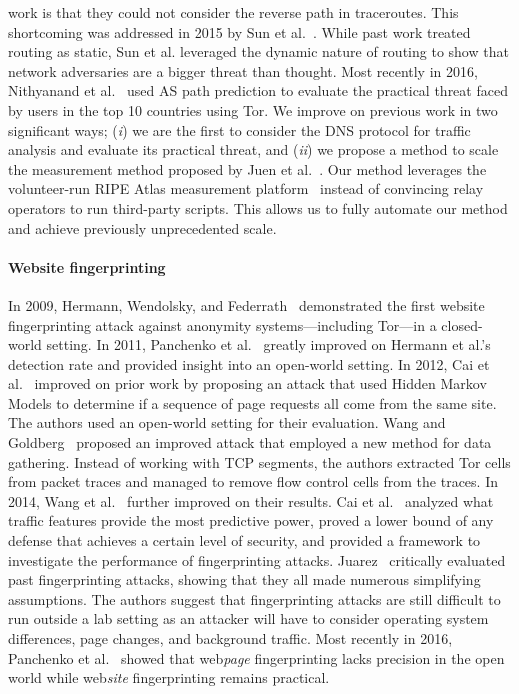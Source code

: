 work is that they could not consider the reverse path in traceroutes.  This
shortcoming was addressed in 2015 by Sun et al.~\cite{Sun2015a}.  While past
work treated routing as static, Sun et al.  leveraged the dynamic nature of
routing to show that network adversaries are a bigger threat than thought.
Most recently in 2016, Nithyanand et al.~\cite{Nithyanand2016a} used AS path
prediction to evaluate the practical threat faced by users in the top 10
countries using Tor.  We improve on previous work in two significant ways;
(\emph{i}) we are the first to consider the DNS protocol for traffic analysis
and evaluate its practical threat, and (\emph{ii}) we propose a method to scale
the measurement method proposed by Juen et al.~\cite{Juen2015a}.  Our method
leverages the volunteer-run RIPE Atlas measurement platform~\cite{atlas}
instead of convincing relay operators to run third-party scripts.  This allows
us to fully automate our method and achieve previously unprecedented scale.

\paragraph{Website fingerprinting}
In 2009, Hermann, Wendolsky, and Federrath~\cite{Hermann2009a} demonstrated the
first website fingerprinting attack against anonymity systems---including
Tor---in a closed-world setting.  In 2011, Panchenko et
al.~\cite{Panchenko2011a} greatly improved on Hermann et al.'s detection rate
and provided insight into an open-world setting.  In 2012, Cai et
al.~\cite{Cai2012a} improved on prior work by proposing an attack that used
Hidden Markov Models to determine if a sequence of page requests all come from
the same site.  The authors used an open-world setting for their evaluation.
Wang and Goldberg~\cite{Wang2013a} proposed an improved attack that employed a
new method for data gathering.  Instead of working with TCP segments, the
authors extracted Tor cells from packet traces and managed to remove flow
control cells from the traces.  In 2014, Wang et al.~\cite{Wang2014a} further
improved on their results.  Cai et al.~\cite{Cai2014b} analyzed what traffic
features provide the most predictive power, proved a lower bound of any defense
that achieves a certain level of security, and provided a framework to
investigate the performance of fingerprinting attacks.
Juarez~\cite{Juarez2014a} critically evaluated past fingerprinting attacks,
showing that they all made numerous simplifying assumptions.  The authors
suggest that fingerprinting attacks are still difficult to run outside a lab
setting as an attacker will have to consider operating system differences, page
changes, and background traffic.  Most recently in 2016, Panchenko et
al.~\cite{Panchenko2016a} showed that web\emph{page} fingerprinting lacks
precision in the open world while web\emph{site} fingerprinting remains
practical.  
